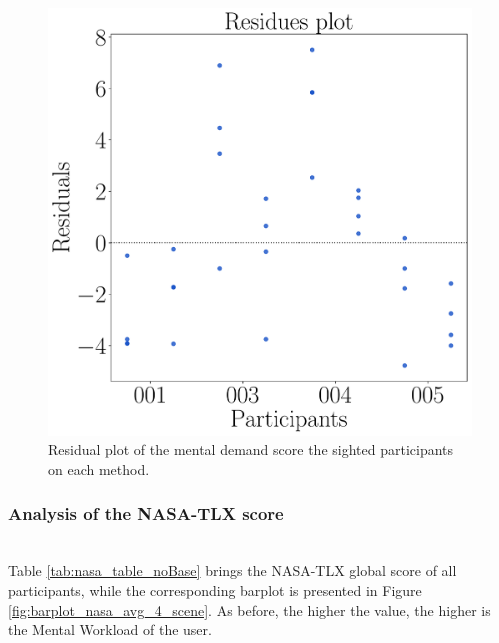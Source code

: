 \begin{figure}[!htb]
\begin{minipage}{0.075\textwidth}
        \hfill
    \end{minipage}
    \begin{minipage}{0.45\textwidth}
        \centering
        \includegraphics[width = \textwidth]{Resultados/Nasa/Figuras/pdf/residplot_md_avg_two_way_sight.pdf}
        \caption{Residual plot of the mental demand score the sighted participants on each method.}
        \label{fig:residplot_md_avg_two_way_sight}
    \end{minipage}
\end{figure}

\FloatBarrier



\subsubsection{Analysis of the NASA-TLX score}\mbox{}\\

Table \ref{tab:nasa_table_noBase} brings the NASA-TLX global score of all participants, while the corresponding barplot is presented in Figure \ref{fig:barplot_nasa_avg_4_scene}. As before, the higher the value, the higher is the Mental Workload of the user.

